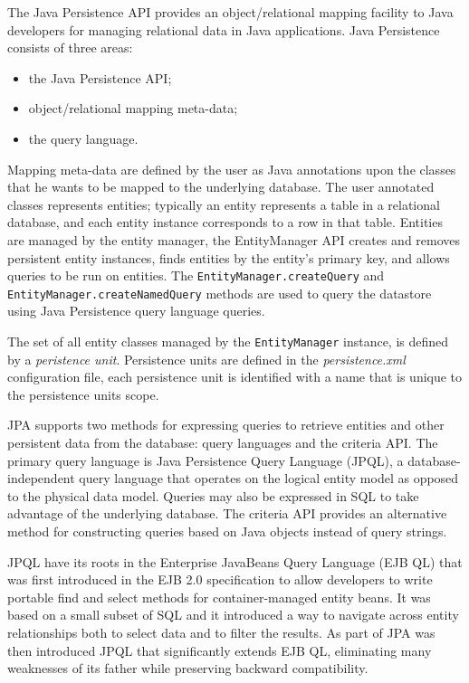 \newparagraph The Java Persistence API provides an object/relational mapping facility to Java developers for managing relational data in Java applications. Java Persistence consists of three areas:
\begin{itemize}
\item the Java Persistence API;
\item object/relational mapping meta-data;
\item the query language.
\end{itemize}

\noindent Mapping meta-data are defined by the user as Java annotations upon the classes that he wants to be mapped to the underlying database.
The user annotated classes represents entities; typically an entity represents a table in a relational database, and each entity instance corresponds to a row in that table. Entities are managed by the entity manager, the EntityManager API creates and removes persistent entity instances, finds entities by the entity’s primary key, and allows queries to be run on entities. 
The \texttt{EntityManager.createQuery} and \texttt{EntityManager.createNamedQuery} methods are used to query the datastore using Java Persistence query language queries. 

\noindent The set of all entity classes managed by the \texttt{EntityManager} instance, is defined by a \textit{peristence unit}.
Persistence units are defined in the \textit{persistence.xml} configuration file, each persistence unit is identified with a name that is unique to the persistence units scope. 

\newparagraph JPA supports two methods for expressing queries to retrieve entities and other persistent data from the database: query languages and the criteria API. The primary query language is Java Persistence Query Language (JPQL), a database-independent query language that operates on the logical entity model as opposed to the physical data model. Queries may also be expressed in SQL to take advantage of the underlying database. The criteria API provides an alternative method for constructing queries based on Java objects instead of query strings.

\noindent JPQL have its roots in the Enterprise JavaBeans Query Language (EJB QL) that was first introduced in the EJB 2.0 specification to allow developers to write portable find and select methods for container-managed entity beans. It was based on a small subset of SQL and it introduced a way to navigate across entity relationships both to select data and to filter the results.
As part of JPA was then introduced JPQL that significantly extends EJB QL, eliminating many weaknesses of its father while preserving backward compatibility.

